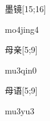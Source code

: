 \begin{verbete}[mo4jing4]{墨镜}[15;16]
\begin{pronuncia}{mo4jing4}
\end{pronuncia}
\end{verbete}

\begin{verbete}[mu3qin0]{母亲}[5;9]
\begin{pronuncia}{mu3qin0}
\end{pronuncia}
\end{verbete}                                                                     

\begin{verbete}[mu3yu3]{母语}[5;9]
\begin{pronuncia}{mu3yu3}
\end{pronuncia}
\end{verbete}                                                                     

